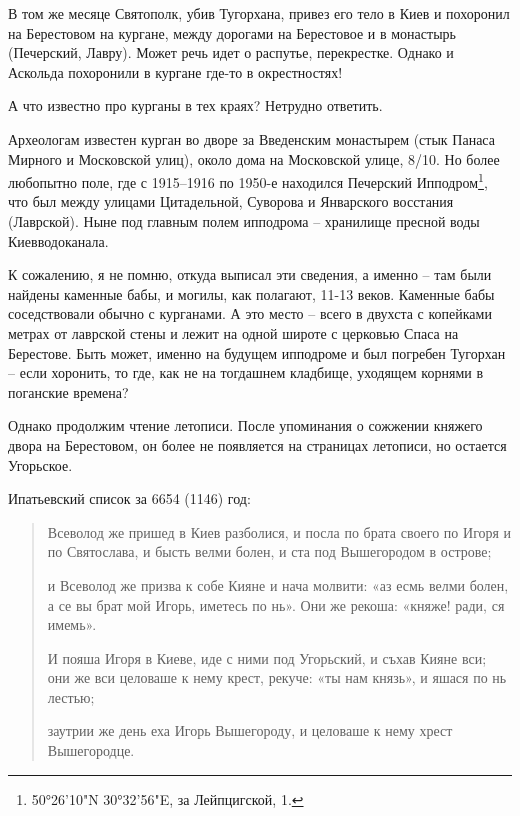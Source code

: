 В том же месяце Святополк, убив Тугорхана, привез его тело в Киев и похоронил на Берестовом на кургане, между дорогами на Берестовое и в монастырь (Печерский, Лавру). Может речь идет о распутье, перекрестке. Однако и Аскольда похоронили в кургане где-то в окрестностях!

А что известно про курганы в тех краях? Нетрудно ответить.

Археологам известен курган во дворе за Введенским монастырем (стык Панаса Мирного и Московской улиц), около дома на Московской улице, 8/10. Но более любопытно поле, где с 1915–1916 по 1950-е находился Печерский Ипподром\footnote{50°26'10"N 30°32'56"E, за Лейпцигской, 1.}, что был между улицами Цитадельной, Суворова и Январского восстания (Лаврской). Ныне под главным полем ипподрома – хранилище пресной воды Киевводоканала.

К сожалению, я не помню, откуда выписал эти сведения, а именно – там были найдены каменные бабы, и могилы, как полагают, 11-13 веков. Каменные бабы соседствовали обычно с курганами. А это место – всего в двухста с копейками метрах от лаврской стены и лежит на одной широте с церковью Спаса на Берестове. Быть может, именно на будущем ипподроме и был погребен Тугорхан – если хоронить, то где, как не на тогдашнем кладбище, уходящем корнями в поганские времена?

Однако продолжим чтение летописи. После упоминания о сожжении княжего двора на Берестовом, он более не появляется на страницах летописи, но остается Угорьское.

Ипатьевский список за 6654 (1146) год:

\begin{quotation}
Всеволод же пришед в Киев разболися, и посла по брата своего по Игоря и по Святослава, и бысть велми болен, и ста под Вышегородом в острове;

и Всеволод же призва к собе Кияне и нача молвити: «аз есмь велми болен, а се вы брат мой Игорь, иметесь по нь». Они же рекоша: «княже! ради, ся имемь».

И пояша Игоря в Киеве, иде с ними под Угорьский, и съхав Кияне вси; они же вси целоваше к нему крест, рекуче: «ты нам князь», и яшася по нь лестью;

заутрии же день еха Игорь Вышегороду, и целоваше к нему хрест Вышегородце.



\end{quotation}

